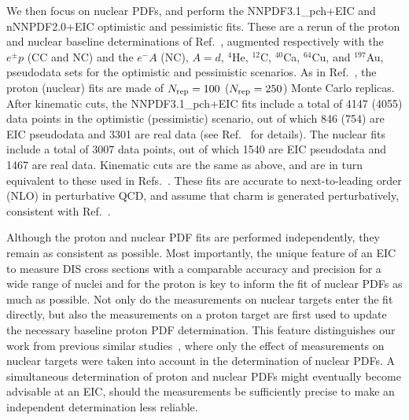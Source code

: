 \documentclass[11pt,a4paper]{article}
\begin{document}
We then focus on nuclear PDFs, and perform the NNPDF3.1\_pch+EIC and
nNNPDF2.0+EIC optimistic and pessimistic fits. These are a rerun of the
proton and nuclear baseline determinations of Ref.~\cite{AbdulKhalek:2020yuc},
augmented respectively with the $e^\pm p$ (CC and NC) and the $e^-A$ (NC),
$A=d$, $^4$He, $^{12}$C, $^{40}$Ca, $^{64}$Cu, and $^{197}$Au,
pseudodata sets for the optimistic and pessimistic scenarios.
As in Ref.~\cite{AbdulKhalek:2020yuc}, the proton (nuclear) fits are made of
$N_{\rm rep}=100$ ($N_{\rm rep}=250$) Monte Carlo replicas. After kinematic 
cuts, the NNPDF3.1\_pch+EIC fits include a total of 4147 (4055) data points
in the optimistic (pessimistic) scenario, out of which 846 (754) are EIC
pseudodata and 3301 are real data (see Ref.~\cite{AbdulKhalek:2020yuc} for
details). The nuclear fits include a total of 3007 data points, out of which
1540 are EIC pseudodata and 1467 are real data. Kinematic cuts are the same as
above, and are in turn equivalent to these used in
Refs.~\cite{Ball:2017nwa,AbdulKhalek:2020yuc}. These fits are accurate to
next-to-leading order (NLO) in perturbative QCD, and assume that charm is
generated perturbatively, consistent with Ref.~\cite{AbdulKhalek:2020yuc}.

Although the proton and nuclear PDF fits are performed independently,
they remain as consistent as possible. Most importantly, the unique
feature of an EIC to measure DIS cross sections with a comparable accuracy and
precision for a wide range of nuclei and for the proton is
key to inform the fit of nuclear PDFs as much as possible. Not only
do the measurements on nuclear targets enter the fit directly, but also the
measurements on a proton target are first used to update the necessary
baseline proton PDF determination. This feature distinguishes our work from
previous similar studies~\cite{Aschenauer:2017oxs,AbdulKhalek:2019mzd}, where
only the effect of measurements on nuclear targets were taken into account in
the determination of nuclear PDFs. A simultaneous determination of proton and
nuclear PDFs might eventually become advisable at an EIC, should the
measurements be sufficiently precise to make an independent determination
less reliable.
\end{document}
